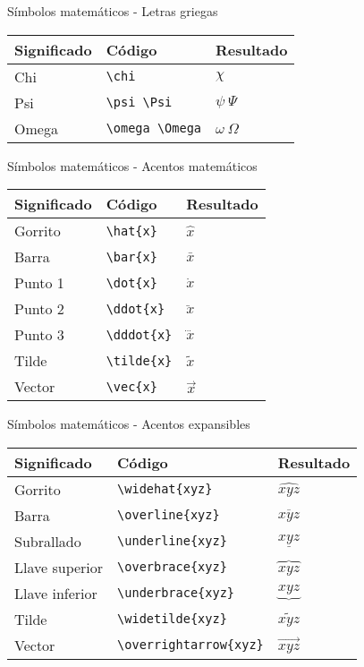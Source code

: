 \documentclass[ignorenonframetext,]{beamer}
\begin{document}
\begin{frame}[fragile]{Símbolos matemáticos - Letras griegas}
\protect\hypertarget{simbolos-matematicos---letras-griegas-3}{}

\begin{longtable}[]{@{}lll@{}}
\toprule
Significado & Código & Resultado\tabularnewline
\midrule
\endhead
Chi & \texttt{\textbackslash{}chi} & \(\chi\)\tabularnewline
Psi & \texttt{\textbackslash{}psi\ \textbackslash{}Psi} &
\(\psi\ \Psi\)\tabularnewline
Omega & \texttt{\textbackslash{}omega\ \textbackslash{}Omega} &
\(\omega\ \Omega\)\tabularnewline
\bottomrule
\end{longtable}

\end{frame}

\begin{frame}[fragile]{Símbolos matemáticos - Acentos matemáticos}
\protect\hypertarget{simbolos-matematicos---acentos-matematicos}{}

\begin{longtable}[]{@{}lll@{}}
\toprule
Significado & Código & Resultado\tabularnewline
\midrule
\endhead
Gorrito & \texttt{\textbackslash{}hat\{x\}} & \(\hat{x}\)\tabularnewline
Barra & \texttt{\textbackslash{}bar\{x\}} & \(\bar{x}\)\tabularnewline
Punto 1 & \texttt{\textbackslash{}dot\{x\}} & \(\dot{x}\)\tabularnewline
Punto 2 & \texttt{\textbackslash{}ddot\{x\}} &
\(\ddot{x}\)\tabularnewline
Punto 3 & \texttt{\textbackslash{}dddot\{x\}} &
\(\dddot{x}\)\tabularnewline
Tilde & \texttt{\textbackslash{}tilde\{x\}} &
\(\tilde{x}\)\tabularnewline
Vector & \texttt{\textbackslash{}vec\{x\}} & \(\vec{x}\)\tabularnewline
\bottomrule
\end{longtable}

\end{frame}

\begin{frame}[fragile]{Símbolos matemáticos - Acentos expansibles}
\protect\hypertarget{simbolos-matematicos---acentos-expansibles}{}

\begin{longtable}[]{@{}lll@{}}
\toprule
Significado & Código & Resultado\tabularnewline
\midrule
\endhead
Gorrito & \texttt{\textbackslash{}widehat\{xyz\}} &
\(\widehat{xyz}\)\tabularnewline
Barra & \texttt{\textbackslash{}overline\{xyz\}} &
\(\overline{xyz}\)\tabularnewline
Subrallado & \texttt{\textbackslash{}underline\{xyz\}} &
\(\underline{xyz}\)\tabularnewline
Llave superior & \texttt{\textbackslash{}overbrace\{xyz\}} &
\(\overbrace{xyz}\)\tabularnewline
Llave inferior & \texttt{\textbackslash{}underbrace\{xyz\}} &
\(\underbrace{xyz}\)\tabularnewline
Tilde & \texttt{\textbackslash{}widetilde\{xyz\}} &
\(\widetilde{xyz}\)\tabularnewline
Vector & \texttt{\textbackslash{}overrightarrow\{xyz\}} &
\(\overrightarrow{xyz}\)\tabularnewline
\bottomrule
\end{longtable}

\end{frame}
\end{document}
